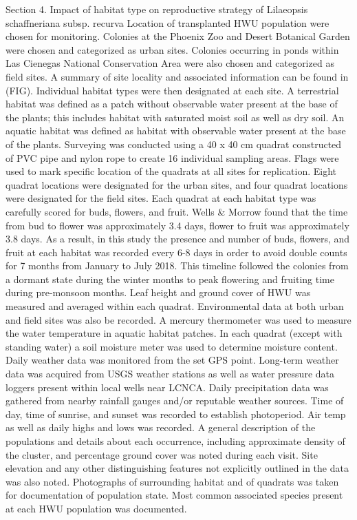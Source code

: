 \documentclass[twocolumn]{article}
\begin{document}
Section 4. Impact of habitat type on reproductive strategy of Lilaeopsis schaffneriana subsp. recurva
Location of transplanted HWU population were chosen for monitoring. Colonies at the Phoenix Zoo and Desert Botanical Garden were chosen and categorized as urban sites. Colonies occurring in ponds within Las Cienegas National Conservation Area were also chosen and categorized as field sites. A summary of site locality and associated information can be found in (FIG). Individual habitat types were then designated at each site. A terrestrial habitat was defined as a patch without observable water present at the base of the plants; this includes habitat with saturated moist soil as well as dry soil. An aquatic habitat was defined as habitat with observable water present at the base of the plants. Surveying was conducted using a 40 x 40 cm quadrat constructed of PVC pipe and nylon rope to create 16 individual sampling areas. Flags were used to mark specific location of the quadrats at all sites for replication. Eight quadrat locations were designated for the urban sites, and four quadrat locations were designated for the field sites. Each quadrat at each habitat type was carefully scored for buds, flowers, and fruit. Wells & Morrow found that the time from bud to flower was approximately 3.4 days, flower to fruit was approximately 3.8 days. As a result, in this study the presence and number of buds, flowers, and fruit at each habitat was recorded every 6-8 days in order to avoid double counts for 7 months from January to July 2018. This timeline followed the colonies from a dormant state during the winter months to peak flowering and fruiting time during pre-monsoon months. Leaf height and ground cover of HWU was measured and averaged within each quadrat. Environmental data at both urban and field sites was also be recorded. A mercury thermometer was used to measure the water temperature in aquatic habitat patches. In each quadrat (except with standing water) a soil moisture meter was used to determine moisture content. Daily weather data was monitored from the set GPS point. Long-term weather data was acquired from USGS weather stations as well as water pressure data loggers present within local wells near LCNCA. Daily precipitation data was gathered from nearby rainfall gauges and/or reputable weather sources. Time of day, time of sunrise, and sunset was recorded to establish photoperiod. Air temp as well as daily highs and lows was recorded. A general description of the populations and details about each occurrence, including approximate density of the cluster, and percentage ground cover was noted during each visit. Site elevation and any other distinguishing features not explicitly outlined in the data was also noted. Photographs of surrounding habitat and of quadrats was taken for documentation of population state. Most common associated species present at each HWU population was documented.
\end{document}
